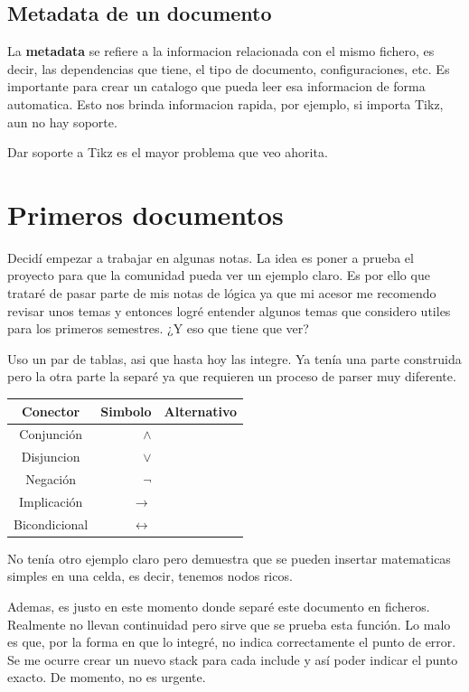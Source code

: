 \documentclass{article}
\begin{document}
  \section{ Metadata de un documento }
  
  La {\bfseries metadata} se refiere a la informacion relacionada con el mismo fichero,
  es decir, las dependencias que tiene, el tipo de documento, configuraciones, etc. Es
  importante para crear un catalogo que pueda leer esa informacion de forma automatica.
  Esto nos brinda informacion rapida, por ejemplo, si importa Tikz, aun no hay soporte.
  
  \alert{ Dar soporte a Tikz es el mayor problema que veo ahorita. }
  
  \chapter{ Primeros documentos }
  
  Decidí empezar a trabajar en algunas notas. La idea es poner a prueba el proyecto para
  que la comunidad pueda ver un ejemplo claro. Es por ello que trataré de pasar parte de
  mis notas de lógica ya que mi acesor me recomendo revisar unos temas y entonces logré
  entender algunos temas que considero utiles para los primeros semestres. ¿Y eso que
  tiene que ver?
  
  Uso un par de tablas, asi que hasta hoy las integre. Ya tenía una parte construida pero
  la otra parte la separé ya que requieren un proceso de parser muy diferente.
  
  \begin{tabular}{ c|rr }
    Conector & Simbolo & Alternativo \\
    \hline
    Conjunción    & $ \land $ & \\
    Disjuncion    & $ \lor $ & \\
    Negación      & $ \neg $ & ~ \\
    Implicación   & $ \rightarrow $ & \\
    Bicondicional & $ \leftrightarrow $ & \\
    \hline
  \end{tabular}
  
  No tenía otro ejemplo claro pero demuestra que se pueden insertar matematicas simples
  en una celda, es decir, tenemos nodos ricos.
  
  Ademas, es justo en este momento donde separé este documento en ficheros. Realmente no
  llevan continuidad pero sirve que se prueba esta función. Lo malo es que, por la forma
  en que lo integré, no indica correctamente el punto de error. Se me ocurre crear un
  nuevo stack para cada include y así poder indicar el punto exacto. De momento, no es urgente.
\end{document}
